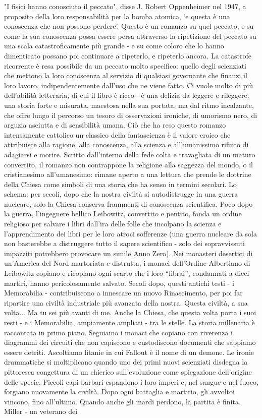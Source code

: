 "I fisici hanno conosciuto il peccato", disse J. Robert Oppenheimer nel 1947, a proposito della loro responsabilità per la bomba atomica, ‘e questa è una conoscenza che non possono perdere’. Questo è un romanzo su quel peccato, e su come la sua conoscenza possa essere persa attraverso la ripetizione del peccato su una scala catastroficamente più grande - e su come coloro che lo hanno dimenticato possano poi continuare a ripeterlo, e ripeterlo ancora. La catastrofe ricorrente è resa possibile da un peccato molto specifico: quello degli scienziati che mettono la loro conoscenza al servizio di qualsiasi governante che finanzi il loro lavoro, indipendentemente dall'uso che ne viene fatto. Ci vuole molto di più dell'abilità letteraria, di cui il libro è ricco - è una delizia da leggere e rileggere: una storia forte e misurata, maestosa nella sua portata, ma dal ritmo incalzante, che offre lungo il percorso un tesoro di osservazioni ironiche, di umorismo nero, di arguzia asciutta e di sensibilità umana. Ciò che ha reso questo romanzo intensamente cattolico un classico della fantascienza è il valore eroico che attribuisce alla ragione, alla conoscenza, alla scienza e all'umanissimo rifiuto di adagiarsi e morire. Scritto dall'interno della fede colta e travagliata di un maturo convertito, il romanzo non contrappone la religione alla saggezza del mondo, o il cristianesimo all'umanesimo: rimane aperto a una lettura che prende le dottrine della Chiesa come simboli di una storia che ha senso in termini secolari. Lo schema: per secoli, dopo che la nostra civiltà si autodistrugge in una guerra nucleare, solo la Chiesa conserva frammenti di conoscenza scientifica. Poco dopo la guerra, l'ingegnere bellico Leibowitz, convertito e pentito, fonda un ordine religioso per salvare i libri dall'ira delle folle che incolpano la scienza e l'apprendimento dei libri per le loro atroci sofferenze (una guerra nucleare da sola non basterebbe a distruggere tutto il sapere scientifico - solo dei sopravvissuti impazziti potrebbero provocare un simile Anno Zero). Nei monasteri desertici di un'America del Nord martoriata e distrutta, i monaci dell'Ordine Albertiano di Leibowitz copiano e ricopiano ogni scarto che i loro “librai”, condannati a dieci martiri, hanno pericolosamente salvato. Secoli dopo, questi antichi testi - i Memorabilia - contribuiscono a innescare un nuovo Rinascimento, per poi far ripartire una civiltà industriale più avanzata della nostra. Questa civiltà, a sua volta... Ma tu sei più avanti di me. Anche la Chiesa, che questa volta porta i suoi resti - e i Memorabilia, ampiamente ampliati - tra le stelle. La storia millenaria è raccontata in primo piano. Seguiamo i monaci che copiano con riverenza i diagrammi dei circuiti che non capiscono e custodiscono documenti che sappiamo essere detriti. Ascoltiamo litanie in cui Fallout è il nome di un demone. Le ironie drammatiche si moltiplicano quando uno dei primi nuovi scienziati disdegna la pittoresca congettura di un chierico sull'evoluzione come spiegazione dell'origine delle specie. Piccoli capi barbari espandono i loro imperi e, nel sangue e nel fuoco, forgiano nuovamente la civiltà. Dopo ogni battaglia e martirio, gli avvoltoi vincono, fino all'ultimo. Quando anche gli inardi perdono, la partita è finita. Miller - un veterano dei 